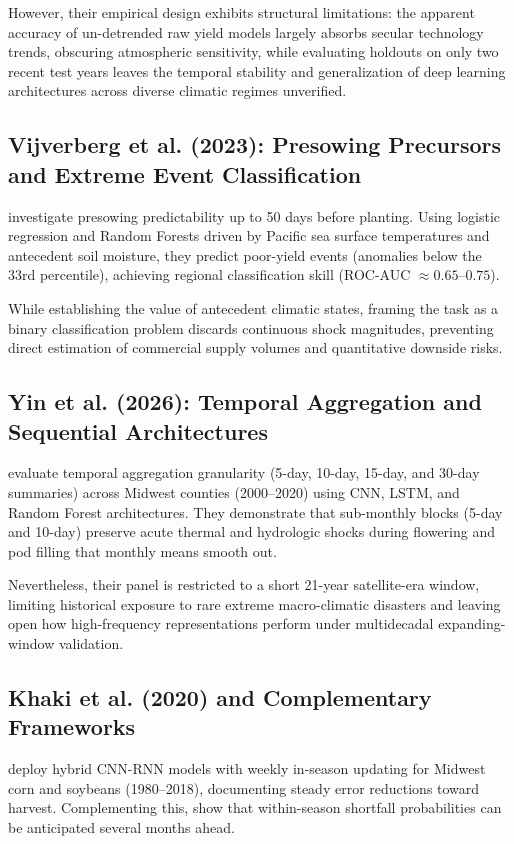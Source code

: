 However, their empirical design exhibits structural limitations: the apparent accuracy of un-detrended raw yield models largely absorbs secular technology trends, obscuring atmospheric sensitivity, while evaluating holdouts on only two recent test years leaves the temporal stability and generalization of deep learning architectures across diverse climatic regimes unverified.

\subsection{Vijverberg et al. (2023): Presowing Precursors and Extreme Event Classification}
\citet{Vijverberg2023} investigate presowing predictability up to 50 days before planting. Using logistic regression and Random Forests driven by Pacific sea surface temperatures and antecedent soil moisture, they predict poor-yield events (anomalies below the 33rd percentile), achieving regional classification skill (ROC-AUC $\approx 0.65$--$0.75$). 

While establishing the value of antecedent climatic states, framing the task as a binary classification problem discards continuous shock magnitudes, preventing direct estimation of commercial supply volumes and quantitative downside risks.

\subsection{Yin et al. (2026): Temporal Aggregation and Sequential Architectures}
\citet{Yinetal2026} evaluate temporal aggregation granularity (5-day, 10-day, 15-day, and 30-day summaries) across Midwest counties (2000--2020) using CNN, LSTM, and Random Forest architectures. They demonstrate that sub-monthly blocks (5-day and 10-day) preserve acute thermal and hydrologic shocks during flowering and pod filling that monthly means smooth out. 

Nevertheless, their panel is restricted to a short 21-year satellite-era window, limiting historical exposure to rare extreme macro-climatic disasters and leaving open how high-frequency representations perform under multidecadal expanding-window validation.

\subsection{Khaki et al. (2020) and Complementary Frameworks}
\citet{Khaki2020} deploy hybrid CNN-RNN models with weekly in-season updating for Midwest corn and soybeans (1980--2018), documenting steady error reductions toward harvest. Complementing this, \citet{Iizumietal2021} show that within-season shortfall probabilities can be anticipated several months ahead. 

